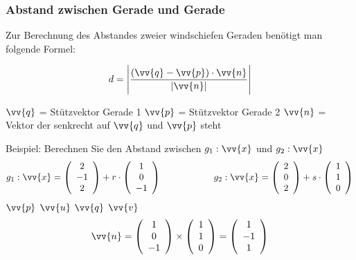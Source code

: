 \documentclass[a4paper, 15pt]{article}
\begin{document}
\subsubsection{Abstand zwischen Gerade und Gerade}
Zur Berechnung des Abstandes zweier windschiefen Geraden benötigt man folgende Formel:\newline\newline
\begin{minipage}{.49\textwidth}
\begin{equation*}
d = \Biggl|\dfrac{(\vv{q}-\vv{p})\cdot\vv{n}}{|\vv{n}|}\Biggl|
\end{equation*}
\end{minipage}
\begin{minipage}{.49\textwidth}
$\vv{q}$ = Stützvektor Gerade 1\newline
$\vv{p}$ = Stützvektor Gerade 2\newline
$\vv{n}$ = Vektor der senkrecht auf $\vv{q}$ und $\vv{p}$ steht
\end{minipage}\newline\newline
Beispiel:\newline
Berechnen Sie den Abstand zwischen $g_1:\vv{x}$ und $g_2:\vv{x}$
\begin{equation*}
g_1:\vv{x} = \left(\begin{array}{c} 2 \\ -1 \\ 2 \end{array}\right) + r \cdot \left(\begin{array}{c} 1 \\ 0 \\ -1 \end{array}\right) \hspace{2cm} g_2:\vv{x} = \left(\begin{array}{c} 2 \\ 0 \\ 2 \end{array}\right) + s \cdot \left(\begin{array}{c} 1 \\ 1 \\ 0 \end{array}\right)
\end{equation*}
\hspace{5cm} $\vv{p}$ \hspace{1.4cm} $\vv{u}$ \hspace{3.85cm} $\vv{q}$ \hspace{1.2cm} $\vv{v}$
\begin{equation*}
\vv{n} = \left(\begin{array}{c} 1 \\ 0 \\ -1 \end{array}\right) \times \left(\begin{array}{c} 1 \\ 1 \\ 0 \end{array}\right) = \left(\begin{array}{c} 1 \\ -1 \\ 1 \end{array}\right)
\end{equation*}
\end{document}
